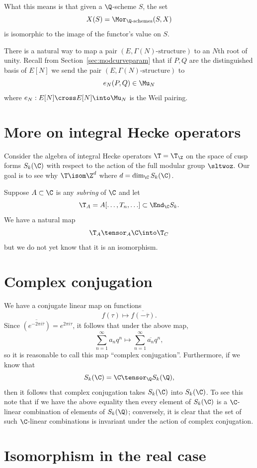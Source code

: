 \documentclass{report}
\begin{document}
What this means is that given a $\Q$-scheme $S$, the
set $$X(S)=\Mor_{\Q\text{-schemes}}(S,X)$$
is isomorphic to
the image of the functor's value on $S$.

There is a natural way to map a pair $(E,\Gamma(N)\text{-structure})$
 to an $N$th root of unity.  Recall from
Section~\ref{sec:modcurveparam} that if $P,Q$ are the distinguished
basis of $E[N]$ we send the pair $(E,\Gamma(N)\text{-structure})$ to
$$e_N(P,Q)\in\Mu_N$$
where $e_N:E[N]\cross E[N]\into \Mu_N$ is the Weil pairing.

\section{More on integral Hecke operators}

Consider the algebra of integral Hecke operators $\T=\T_{\Z}$
on the space of cusp forms $S_k(\C)$ with respect to the action
of the full modular group $\sltwoz$. Our goal is to see why
$\T\isom\Z^d$ where $d=\dim_{\C}S_k(\C)$.

Suppose $A\subset\C$ is any {\em subring} of $\C$ and let
$$\T_A=A[\ldots,T_n,\ldots]\subset \End_{\C}S_k.$$
We have a natural map
$$\T_A\tensor_A\C\into\T_C$$
but we do not yet know that it is
an isomorphism.

\section{Complex conjugation}\label{sec:conjugation}
We have a conjugate linear map on functions
$$f(\tau)\mapsto \overline{f(-\overline{\tau})}.$$
Since $\overline{(e^{-2\pi i\overline{\tau}})}=e^{2\pi i \tau}$,
it follows that under the above map,
$$\sum_{n=1}^{\infty} a_n q^n \mapsto
                 \sum_{n=1}^{\infty}\overline{a_n}q^n,$$
so it is reasonable to call this map ``complex conjugation''. Furthermore,
if we know that
$$S_k(\C)=\C\tensor_{\Q}S_k(\Q),$$
then it follows that complex conjugation
takes $S_k(\C)$ into $S_k(\C)$. To see this note that if
we have the above equality then every element of
$S_k(\C)$ is a $\C$-linear combination of elements of
$S_k(\Q)$; conversely, it is clear that the set of such
$\C$-linear combinations is invariant under the action
of complex conjugation.

\section{Isomorphism in the real case}
\end{document}
